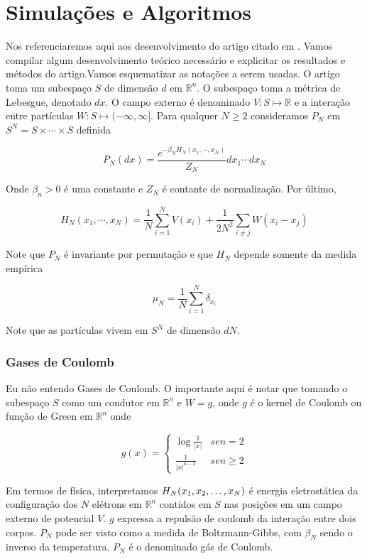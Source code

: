 \chapter{Simulações e Algoritmos}

Nos referenciaremos aqui aos desenvolvimento do artigo citado em \cite{Chafa__2018}. Vamos compilar algum desenvolvimento teórico necessário e explicitar os resultados e métodos do artigo.Vamos esquematizar as notações a serem usadas. O artigo toma um subespaço $S$ de dimensão $d$ em $\mathbb{R}^n$. O subespaço toma a métrica de Lebesgue, denotado $dx$. O campo externo é denominado $V : S \mapsto \mathbb{R}$ e a interação entre partículas $W : S \mapsto (-\infty, \infty]$. Para qualquer $N \geq 2$ consideramos $P_N$ em $S^N = S \times \cdots \times S$ definida

\[
P_N(dx) = \frac{e^{-\beta_N H_N(x_1,\cdots,x_N)}}{Z_N} dx_1 \cdots dx_N
\]

Onde $\beta_n > 0$ é uma constante e $Z_N$ é contante de normalização. Por último,

\[
H_N(x_1, \cdots, x_N) = \frac{1}{N} \sum_{i=1}^{N} V(x_i) + \frac{1}{2N^2} \sum_{i\neq j} W(x_i - x_j)
\]

Note que $P_N$ é invariante por permutação e que $H_N$ depende somente da medida empírica

\[
\mu_N = \frac{1}{N} \sum_{i=1}^{N} \delta_{x_i}
\]

Note que as partículas vivem em $S^N$ de dimensão $dN$.

\subsection{Gases de Coulomb}

Eu não entendo Gases de Coulomb. O importante aqui é notar que tomando o subespaço $S$ como um condutor em $\mathbb{R}^n$ e $W = g$, onde $g$ é o kernel de Coulomb ou função de Green em $\mathbb{R}^n$ onde

\[
g(x) = 
\begin{cases}
	\log \frac{1}{|x|} & se n = 2 \\
	\frac{1}{|x|^{n-2}} & se n \geq 2
\end{cases}
\]

Em termos de física, interpretamos $H_N(x_1, x_2, \dots, x_N)$ é energia eletrostática da configuração dos $N$ elétrons em $\mathbb{R}^n$ contidos em $S$ nas posições  em um campo externo de potencial $V$. $g$ expressa a repulsão de coulomb da interação entre dois corpos. $P_N$ pode ser visto como a medida de Boltzmann-Gibbs, com $\beta_N$ sendo o inverso da temperatura. $P_N$ é o denominado gás de Coulomb.

